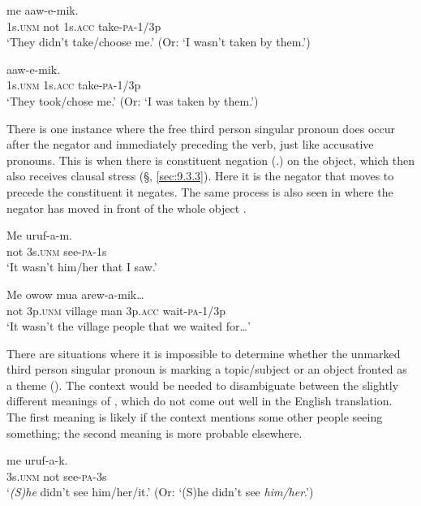 \ea%
\label{ex:3:x684}
\gll {} me  aaw-e-mik. \\
1s.\textsc{unm} not 1s.\textsc{acc} take-\textsc{pa}-1/3p\\
\glt`They didn't take/choose me.' (Or: `I wasn't taken by them.')
\z

\ea%
\label{ex:3:x560}
\gll {}  aaw-e-mik. \\
1s.\textsc{unm} 1s.\textsc{acc} take-\textsc{pa}-1/3p\\
\glt`They took/chose me.' (Or: `I was taken by them.')
\z

There is one instance where the free third person singular pronoun does occur after the negator and immediately preceding the verb, just like accusative pronouns. This is when there is constituent negation (.) on the object, which then also receives clausal stress  (§, \ref{sec:9.3.3}). Here it is the negator that moves to precede the constituent it negates. The same process is also seen in  where the negator has moved in front of the whole object . 

\ea%
\label{ex:3:x561}
\gll Me  uruf-a-m. \\
not 3s.\textsc{unm} see-\textsc{pa}-1s\\
\glt`It wasn't him/her that I saw.'
\z

\ea%
\label{ex:3:x562}
\gll Me  owow mua  arew-a-mik{\dots} \\
not 3p.\textsc{unm} village man 3p.\textsc{acc} wait-\textsc{pa}-1/3p\\
\glt`It wasn't the village people that we waited for{\dots}'
\z

There are situations where it is impossible to determine whether the unmarked third person singular pronoun is marking a topic/subject or an object fronted as a theme (). The context would be needed to disambiguate between the slightly different meanings of , which do not come out well in the English translation. The first meaning is likely if the context mentions some other people seeing something; the second meaning is more probable elsewhere. 

\ea%
\label{ex:3:x563}
\gll {} me uruf-a-k. \\
3s.\textsc{unm} not see-\textsc{pa}-3s\\
\glt`\textit{(S)he} didn't see him/her/it.' (Or: `(S)he didn't see \textit{him/her}.')
\z

